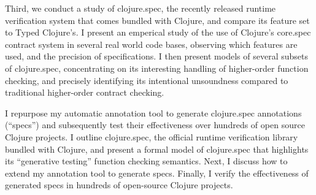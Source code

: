 Third, we conduct a study of clojure.spec, the recently released runtime verification
system that comes bundled with Clojure, and compare its feature set to Typed Clojure's.
I present an emperical study of the use of Clojure's core.spec contract system in several
real world code bases, observing which features are used, and the precision of
specifications.
I then present models of several subsets of clojure.spec, concentrating on its interesting
handling of higher-order function checking, and precisely identifying its intentional
unsoundness compared to traditional higher-order contract checking.

I repurpose my automatic annotation tool to generate clojure.spec annotations (``specs'')
and subsequently test their effectiveness over hundreds of open source Clojure projects.
I outline clojure.spec, the official runtime verification
library bundled with Clojure, and present a formal model of clojure.spec that highlights its
``generative testing'' function checking semantics.
Next, I discuss how to extend my annotation tool to generate specs.
Finally, I verify the effectiveness of generated specs in hundreds of open-source Clojure projects.

